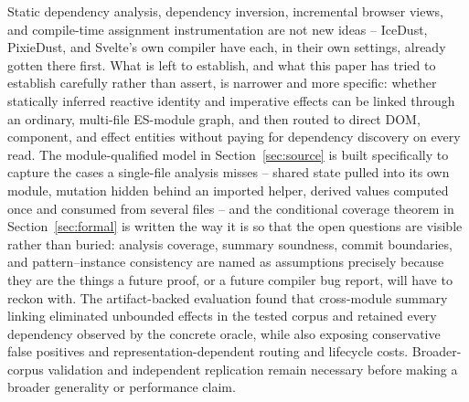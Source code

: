 \documentclass[conference]{IEEEtran}
\begin{document}
Static dependency analysis, dependency inversion, incremental browser views,
and compile-time assignment instrumentation are not new ideas -- IceDust,
PixieDust, and Svelte's own compiler have each, in their own settings,
already gotten there first. What is left to establish, and what this paper
has tried to establish carefully rather than assert, is narrower and more
specific: whether statically inferred reactive identity and imperative
effects can be linked through an ordinary, multi-file ES-module graph, and
then routed to direct DOM, component, and effect entities without paying for
dependency discovery on every read. The module-qualified model in
Section~\ref{sec:source} is built specifically to capture the cases a
single-file analysis misses -- shared state pulled into its own module,
mutation hidden behind an imported helper, derived values computed once and
consumed from several files -- and the conditional coverage theorem in
Section~\ref{sec:formal} is written the way it is so that the open questions
are visible rather than buried: analysis coverage, summary soundness, commit
boundaries, and pattern--instance consistency are named as assumptions
precisely because they are the things a future proof, or a future compiler
bug report, will have to reckon with. The artifact-backed evaluation found
that cross-module summary linking eliminated unbounded effects in the tested
corpus and retained every dependency observed by the concrete oracle, while
also exposing conservative false positives and representation-dependent
routing and lifecycle costs. Broader-corpus validation and independent
replication remain necessary before making a broader generality or performance
claim.
\end{document}
